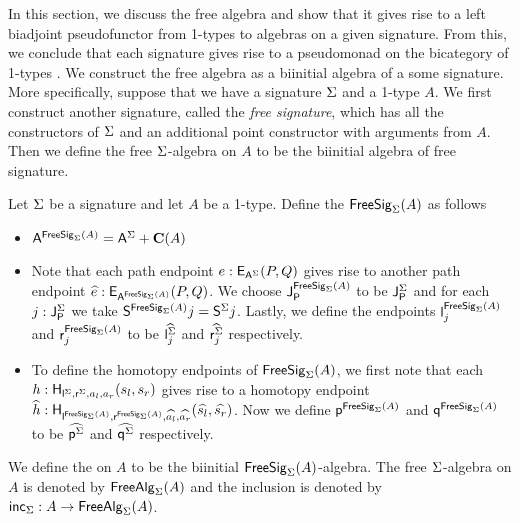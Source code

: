 In this section, we discuss the free algebra and show that it gives rise to a left biadjoint pseudofunctor from 1-types to algebras on a given signature.
From this, we conclude that each signature gives rise to a pseudomonad on the bicategory of 1-types \cite{LACK2000179}.
We construct the free algebra as a biinitial algebra of a some signature.
More specifically, suppose that we have a signature $\sign$ and a 1-type $A$.
We first construct another signature, called the \emph{free signature}, which has all the constructors of $\sign$ and an additional point constructor with arguments from $A$.
Then we define the free $\sign$-algebra on $A$ to be the biinitial algebra of free signature.

\begin{definition}
Let $\sign$ be a signature and let $A$ be a 1-type.
Define the  $\freesign{\sign}{A}$ as follows
\begin{itemize}
	\item $\pointconstr[\freesign{\sign}{A}] = \sumP{\pointconstr[\sign]}{\constantP{A}}$
	\item Note that each path endpoint $e : \pathendpoint{\pointconstr[\sign]}{P}{Q}$ gives rise to another path endpoint $\freepath{e} : \pathendpoint{\pointconstr[\freesign{\sign}{A}]}{P}{Q}$.
	We choose $\pathlabel[\freesign{\sign}{A}]$ to be $\pathlabel[\sign]$ and for each $j : \pathlabel[\sign]$ we take $\patharg[\freesign{\sign}{A}]{j} = \patharg[\sign]{j}$.
	Lastly, we define the endpoints $\pathleft[\freesign{\sign}{A}]_j$ and $\pathright[\freesign{\sign}{A}]_j$ to be $\freepath{\pathleft[\sign]_j}$ and $\freepath{\pathright[\sign]_j}$ respectively.
	\item To define the homotopy endpoints of $\freesign{\sign}{A}$, we first note that each $h : \homotendpoint{\pathleft[\sign]}{\pathright[\sign]}{a_l}{a_r}{s_l}{s_r}$ gives rise to a homotopy endpoint $\freehomot{h} : \homotendpoint{\pathleft[\freesign{\sign}{A}]}{\pathright[\freesign{\sign}{A}]}{\freepath{a_l}}{\freepath{a_r}}{\freepath{s_l}}{\freepath{s_r}}$.
	Now we define $\homotleft[\freesign{\sign}{A}]$ and $\homotright[\freesign{\sign}{A}]$ to be $\freehomot{\homotleft[\sign]}$ and $\freehomot{\homotright[\sign]}$ respectively.
\end{itemize}
We define the  on $A$ to be the biinitial $\freesign{\sign}{A}$-algebra.
The free $\sign$-algebra on $A$ is denoted by $\freealg{\sign}{A}$ and the inclusion is denoted by $\freealginc{\sign} : A \rightarrow \freealg{\sign}{A}$.
\end{definition}

